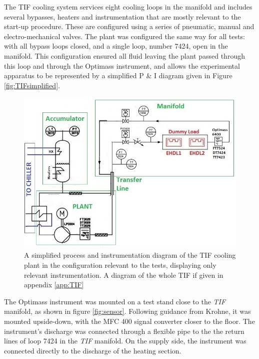 \documentclass{report}
\begin{document}
The TIF cooling system services eight cooling loops in the manifold and includes several bypasses, heaters and instrumentation that are mostly relevant to the  start-up procedure. These are configured using a series of pneumatic, manual and electro-mechanical valves. 
The plant was configured the same way for all tests: with all bypass loops closed, and a single loop, number 7424, open in the manifold. This configuration ensured all fluid leaving the plant passed through this loop and through the Optimass instrument, and allows the experimental apparatus to be represented by a simplified P \& I diagram given in Figure \ref{fig:TIFsimplified}.
\begin{figure}
\includegraphics[width=\textwidth]{TIFsimplified.jpg}
\caption{A simplified process and instrumentation diagram of the TIF cooling plant in the configuration relevant to the tests, displaying only relevant instrumentation. A diagram of the whole TIF if given in appendix \ref{app:TIF}}
\label{fig:Tifsimplified}
\end{figure}
The Optimass instrument was mounted on a test stand close to the \textit{TIF} manifold, as shown in figure \ref{fig:sensor}. Following guidance from Krohne, it was mounted upside-down, with the MFC 400 signal converter closer to the floor. The instrument's discharge was connected through a flexible pipe to the the return lines of loop 7424 in the \textit{TIF} manifold. On the supply side, the instrument was connected directly to the discharge of the heating section. 
\end{document}
